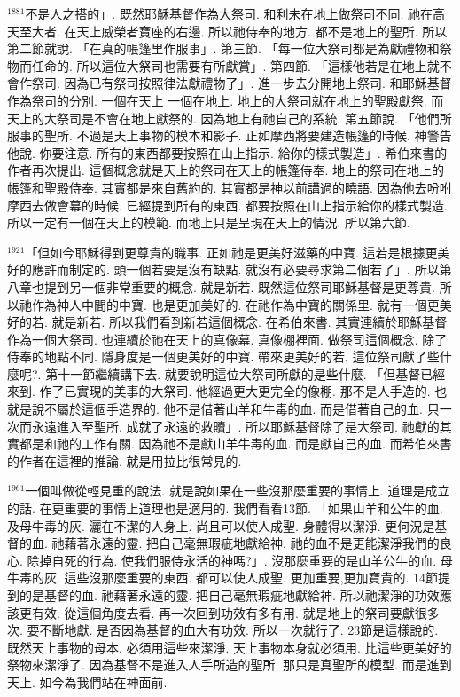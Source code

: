 \documentclass{book}
\begin{document}
$^{1881}$不是人之搭的」.
既然耶穌基督作為大祭司.
和利未在地上做祭司不同.
祂在高天至大者.
在天上威榮者寶座的右邊.
所以祂侍奉的地方.
都不是地上的聖所.
所以第二節就說.
「在真的帳篷里作服事」.
第三節.
「每一位大祭司都是為獻禮物和祭物而任命的.
所以這位大祭司也需要有所獻賞」.
第四節.
「這樣他若是在地上就不會作祭司.
因為已有祭司按照律法獻禮物了」.
進一步去分開地上祭司.
和耶穌基督作為祭司的分別.
一個在天上 一個在地上.
地上的大祭司就在地上的聖殿獻祭.
而天上的大祭司是不會在地上獻祭的.
因為地上有祂自己的系統.
第五節說.
「他們所服事的聖所.
不過是天上事物的模本和影子.
正如摩西將要建造帳篷的時候.
神警告他說.
你要注意.
所有的東西都要按照在山上指示.
給你的樣式製造」.
希伯來書的作者再次提出.
這個概念就是天上的祭司在天上的帳篷侍奉.
地上的祭司在地上的帳篷和聖殿侍奉.
其實都是來自舊約的.
其實都是神以前講過的曉語.
因為他去吩咐摩西去做會幕的時候.
已經提到所有的東西.
都要按照在山上指示給你的樣式製造.
所以一定有一個在天上的模範.
而地上只是呈現在天上的情況.
所以第六節.

$^{1921}$「但如今耶穌得到更尊貴的職事.
正如祂是更美好滋藥的中寶.
這若是根據更美好的應許而制定的.
頭一個若要是沒有缺點.
就沒有必要尋求第二個若了」.
所以第八章也提到另一個非常重要的概念.
就是新若.
既然這位祭司耶穌基督是更尊貴.
所以祂作為神人中間的中寶.
也是更加美好的.
在祂作為中寶的關係里.
就有一個更美好的若.
就是新若.
所以我們看到新若這個概念.
在希伯來書.
其實連續於耶穌基督作為一個大祭司.
也連續於祂在天上的真像幕.
真像棚裡面.
做祭司這個概念.
除了侍奉的地點不同.
隱身度是一個更美好的中寶.
帶來更美好的若.
這位祭司獻了些什麼呢?.
第十一節繼續講下去.
就要說明這位大祭司所獻的是些什麼.
「但基督已經來到.
作了已實現的美事的大祭司.
他經過更大更完全的像棚.
那不是人手造的.
也就是說不屬於這個手造界的.
他不是借著山羊和牛毒的血.
而是借著自己的血.
只一次而永遠進入至聖所.
成就了永遠的救贖」.
所以耶穌基督除了是大祭司.
祂獻的其實都是和祂的工作有關.
因為祂不是獻山羊牛毒的血.
而是獻自己的血.
而希伯來書的作者在這裡的推論.
就是用拉比很常見的.

$^{1961}$一個叫做從輕見重的說法.
就是說如果在一些沒那麼重要的事情上.
道理是成立的話.
在更重要的事情上道理也是適用的.
我們看看13節.
「如果山羊和公牛的血.
及母牛毒的灰.
灑在不潔的人身上.
尚且可以使人成聖.
身體得以潔淨.
更何況是基督的血.
祂藉著永遠的靈.
把自己毫無瑕疵地獻給神.
祂的血不是更能潔淨我們的良心.
除掉自死的行為.
使我們服侍永活的神嗎?」.
沒那麼重要的是山羊公牛的血.
母牛毒的灰.
這些沒那麼重要的東西.
都可以使人成聖.
更加重要,更加寶貴的.
14節提到的是基督的血.
祂藉著永遠的靈.
把自己毫無瑕疵地獻給神.
所以祂潔淨的功效應該更有效.
從這個角度去看.
再一次回到功效有多有用.
就是地上的祭司要獻很多次.
要不斷地獻.
是否因為基督的血大有功效.
所以一次就行了.
23節是這樣說的.
既然天上事物的母本.
必須用這些來潔淨.
天上事物本身就必須用.
比這些更美好的祭物來潔淨了.
因為基督不是進入人手所造的聖所.
那只是真聖所的模型.
而是進到天上.
如今為我們站在神面前.
\end{document}
